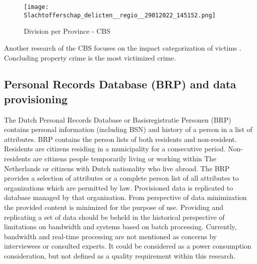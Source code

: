\graphicspath{ {./images/} }
\begin{figure}
\texttt{[image: Slachtofferschap\_delicten\_\_regio\_\_29012022\_145152.png]}\\
\caption{Division per Province  \cite{CBS_IDFraudTable} - CBS}  
\label{fig:CBS_ID_fraud}
\end{figure}

Another research of the CBS focuses on the impact categorization of victims {\cite{CBS_casualtiesDigitalCrime}}. Concluding property crime is the most victimized crime. 


\subsection{Personal Records Database (BRP) and data provisioning}\label{BRP}
The Dutch Personal Records Database or Basisregistratie Personen (BRP) contains personal information (including BSN) and history of a person in a list of attributes. BRP contains the person lists of both residents and non-resident. Residents are citizens residing in a municipality for a consecutive period. Non-residents are citizens people temporarily living or working within The Netherlands or citizens with Dutch nationality who live abroad. \cite{BRP} The BRP provides a selection of attributes or a complete person list of all attributes to organizations which are permitted by law. Provisioned data is replicated to database managed by that organization. From perspective of data minimization the provided content is minimized for the purpose of use.  
Providing and replicating a set of data should be beheld in the historical perspective of limitations on bandwidth and systems based on batch processing. Currently, bandwidth and real-time processing are not mentioned as concerns by interviewees or consulted experts. It could be considered as a power consumption consideration, but not defined as a quality requirement within this research.

